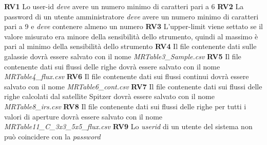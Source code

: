 \documentclass[12pt,a4paper,onecolumn,x11names]{article}
\begin{document}
		\begin{flushleft}
			\textbf{RV1} Lo user-id \textit{deve} avere un numero minimo di caratteri pari a 6\newline
			\textbf{RV2} La password di un utente amministratore \textit{deve} avere un numero minimo di caratteri pari a 9 e \textit{deve} contenere almeno un numero\newline
			\textbf{RV3} L'upper-limit viene settato se il valore misurato era minore della sensibilità dello strumento, quindi al massimo è pari al minimo della sensibilità dello strumento\newline
			\textbf{RV4} Il file contenente dati sulle galassie dovrà essere salvato con il nome \textit{MRTable3\_Sample.csv}\newline
			\textbf{RV5} Il file contenente dati sui flussi delle righe dovrà essere salvato con il nome \textit{MRTable4\_flux.csv}\newline
			\textbf{RV6} Il file contenente dati sui flussi continui dovrà essere salvato con il nome \textit{MRTable6\_cont.csv}\newline
			\textbf{RV7} Il file contenente dati sui flussi delle righe calcolati dal satellite Spitzer dovrà essere salvato con il nome \textit{MRTable8\_irs.csv}\newline
			\textbf{RV8} Il file contenente dati sui flussi delle righe per tutti i valori di aperture dovrà essere salvato con il nome \textit{MRTable11\_C\_3x3\_5x5\_flux.csv}\newline
			\textbf{RV9} Lo \textit{userid} di un utente del sistema non può coincidere con la \textit{password}\newline
		\end{flushleft}

%			
		
\end{document}
